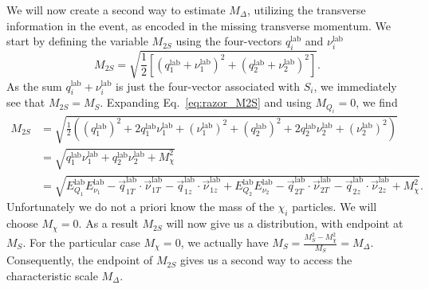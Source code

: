 We will now create a second way to estimate $M_\Delta$, utilizing the transverse information in the
event, as encoded in the missing transverse momentum. We start by defining the variable $M_{2S}$
using the four-vectors $q_i^{\textrm{lab}}$ and $\nu_i^{\textrm{lab}}$
\begin{equation}
  M_{2S} = \sqrt{\frac{1}{2} \left[  (q_1^{\textrm{lab}} + \nu_1^{\textrm{lab}})^2 +
(q_2^{\textrm{lab}} + \nu_2^{\textrm{lab}})^2 \right] } . \label{eq:razor_M2S}
\end{equation}
As the sum $q_i^{\textrm{lab}} + \nu_i^{\textrm{lab}}$ is just the four-vector associated with
$S_i$, we immediately see that $M_{2S} = M_S$. Expanding Eq.~\ref{eq:razor_M2S} and using $M_{Q_i}
= 0$, we find
\begin{align}
  M_{2S} &= \sqrt{\frac{1}{2} \left( (q_1^{\textrm{lab}})^2 + 2 q_1^{\textrm{lab}}
\nu_1^{\textrm{lab}} + (\nu_1^{\textrm{lab}})^2 + (q_2^{\textrm{lab}})^2 + 2 q_2^{\textrm{lab}}
\nu_2^{\textrm{lab}} + (\nu_2^{\textrm{lab}})^2\right) } \\
         &= \sqrt{ q_1^{\textrm{lab}}\nu_1^{\textrm{lab}} + q_2^{\textrm{lab}}\nu_2^{\textrm{lab}}
+ M_\chi^2} \\
         &= \sqrt{ E^{\textrm{lab}}_{Q_1} E^{\textrm{lab}}_{\nu_1} - \vec{q}^{\textrm{lab}}_{1T}
\cdot \vec{\nu}^{\textrm{lab}}_{1T} - \vec{q}^{\textrm{lab}}_{1z} \cdot
\vec{\nu}^{\textrm{lab}}_{1z}
                  + E^{\textrm{lab}}_{Q_2} E^{\textrm{lab}}_{\nu_2} - \vec{q}^{\textrm{lab}}_{2T}
\cdot \vec{\nu}^{\textrm{lab}}_{2T} - \vec{q}^{\textrm{lab}}_{2z} \cdot
\vec{\nu}^{\textrm{lab}}_{2z} + M_\chi^2} .
\end{align}
Unfortunately we do not a priori know the mass of the $\chi_i$ particles. We will choose $M_\chi =
0$. As a result $M_{2S}$ will now give us a distribution, with endpoint at $M_S$. For the
particular case $M_\chi = 0$, we actually have $M_S = \frac{M_S^2-M_\chi^2}{M_S} = M_\Delta$.
Consequently, the endpoint of $M_{2S}$ gives us a second way to access the characteristic scale
$M_\Delta$.

